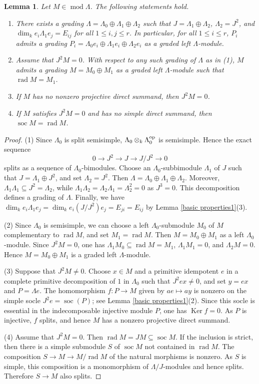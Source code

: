 \documentclass{amsart}
\newtheorem{lem}[thm]{Lemma}
\theoremstyle{definition}
\theoremstyle{remark}
\numberwithin{equation}{thm}
\def\dim{\operatorname{dim}}
\def\ker{\operatorname{Ker}}
\def\L{\Lambda}
\def\le{\leqslant}
\def\mod{\operatorname{mod}}
\def\rad{\operatorname{rad}}
\def\soc{\operatorname{soc}}
\begin{document}
\begin{lem}\label{basic properties2}
Let $M\in\mod\L$. The following statements hold.
\begin{enumerate}[{\rm (1)}]
\item There exists a grading $\L=\L_0\oplus\L_1\oplus\L_2$ such that $J=\L_1\oplus\L_2$, $\L_2=J^2$, and $\dim_k e_i\L_1e_j=E_{ij}$ for all $1\le i,j\le r$.
In particular, for all $1\le i\le r$, $P_i$ admits a grading $P_i=\L_0 e_i\oplus\L_1 e_i\oplus\L_2 e_i$ as a graded left $\L$-module.
\item Assume that $J^2M=0$.
With respect to any such grading of $\L$ as in {\rm (1)}, $M$ admits a grading $M=M_0\oplus M_1$ as a graded left $\L$-module such that $\rad M=M_1$.
\item If $M$ has no nonzero projective direct summand, then $J^2M=0$.
\item If $M$ satisfies $J^2M=0$ and has no simple direct summand, then $\soc M=\rad M$.
\end{enumerate}
\end{lem}

\begin{proof}
(1) Since $\L_0$ is split semisimple, $\L_0\otimes_k\L_0^{\rm op}$ is semisimple. Hence the exact sequence
$$
0\to J^2\to J\to J/J^2\to0
$$
splits as a sequence of $\L_0$-bimodules. Choose an $\L_0$-subbimodule $\L_1$ of $J$ such that $J=\L_1\oplus J^2$, and set $\L_2=J^2$. Then $\L=\L_0\oplus\L_1\oplus\L_2$.
Moreover, $\L_1\L_1\subseteq J^2=\L_2$, while $\L_1\L_2=\L_2\L_1=\L_2^2=0$ as $J^3=0$. This decomposition defines a grading of $\L$. Finally, we have $\dim_ke_i\L_1e_j=\dim_ke_i(J/J^2)e_j=E_{ji}=E_{ij}$ by Lemma \ref{basic properties1}(3).

(2) Since $\L_0$ is semisimple, we can choose a left $\L_0$-submodule $M_0$ of $M$ complementary to $\rad M$, and set $M_1=\rad M$. Then $M=M_0\oplus M_1$ as a left $\L_0$-module. Since $J^2M=0$, one has $\L_1M_0\subseteq\rad M=M_1$, $\L_1M_1=0$, and $\L_2M=0$. Hence $M=M_0\oplus M_1$ is a graded left $\L$-module.

(3) Suppose that $J^2M\ne0$. Choose $x\in M$ and a primitive idempotent $e$ in a complete primitive decomposition of $1$ in $\L_0$ such that $J^2ex\ne0$, and set $y=ex$ and $P=\L e$. The homomorphism $f:P\to M$ given by $ae\mapsto ay$ is nonzero on the simple socle $J^2e=\soc(P)$; see Lemma \ref{basic properties1}(2). Since this socle is essential in the indecomposable injective module $P$, one has $\ker f=0$. As $P$ is injective, $f$ splits, and hence $M$ has a nonzero projective direct summand.

(4) Assume that $J^2M=0$. Then $\rad M=JM\subseteq\soc M$. If the inclusion is strict, then there is a simple submodule $S$ of $\soc M$ not contained in $\rad M$. 
The composition $S\to M\to M/\rad M$ of the natural morphisms is nonzero.
As $S$ is simple, this composition is a monomorphism of $\L/J$-modules and hence splits. 
Therefore $S\to M$ also splits.
\end{proof}
\end{document}

